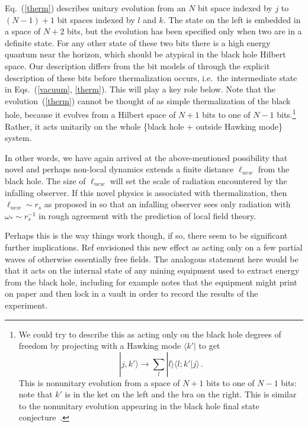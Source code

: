 \documentclass[12pt]{article}
\begin{document}
Eq.~(\ref{therm}) describes unitary evolution from an $N$ bit space indexed by $j$ to $(N-1)+1$ bit spaces indexed by $l$ and $k$.  The state on the left is embedded in a space of $N+2$ bits, but the evolution has been specified only when two are in a definite state.  For any other state of these two bits there is a high energy quantum near the horizon, {which} should be atypical in the black hole Hilbert space.  Our description differs from the bit models of \cite{Mathur:2009hf, Czech:2011wy, Giddings:2011ks, Avery:2011nb, Mathur:2012zp} through the explicit description of these bits before thermalization occurs,  i.e.\ the intermediate state in Eqs.~(\ref{vacuum}, \ref{therm}).  This will play a key role below.  Note that the evolution~(\ref{therm}) cannot be thought of as simple thermalization of the black hole, because it evolves from a Hilbert space of $N+1$ bits to one of $N-1$ bits.\footnote{We could try to describe this as acting only on the black hole degrees of freedom by projecting with a Hawking mode  $\langle k' |$ to get
\begin{equation}
\label{new}
|j , k' \rangle \to \sum_l  |l \rangle \langle l;k'|j\rangle \,.
\end{equation}
This is nonunitary evolution from a space of $N+1$ bits to one of $N-1$ bits: note that $k'$ is in the ket on the left and the bra on the right.  This is similar to the nonunitary evolution appearing in the black hole final state conjecture~\cite{Horowitz:2003he}.}
Rather, it acts unitarily on the whole \{black hole + outside Hawking mode\} system.

In other words, we have again arrived at the above-mentioned possibility that novel and perhaps non-local dynamics extends a finite distance $\ell_{new}$ from the black hole.  The size of $\ell_{new}$ will set the scale of radiation encountered by the infalling observer.  If this novel physics is associated with thermalization, then $\ell_{new} \sim r_s$ as proposed in \cite{Giddings:2011ks} so that an infalling observer sees only radiation with $\omega_* \sim r_s^{-1}$ in rough agreement with the prediction of local field theory.

Perhaps this is the way things work though, if so, there seem to be significant further implications.  Ref \cite{Giddings:2011ks} envisioned this new effect as acting only on a few partial waves of otherwise essentially free fields.  The analogous statement here would be that it acts on the internal state of any mining equipment used to extract energy from the black hole, including for example
notes that the equipment might print on paper and then lock in a vault in order to record the results of the experiment.
\end{document}
